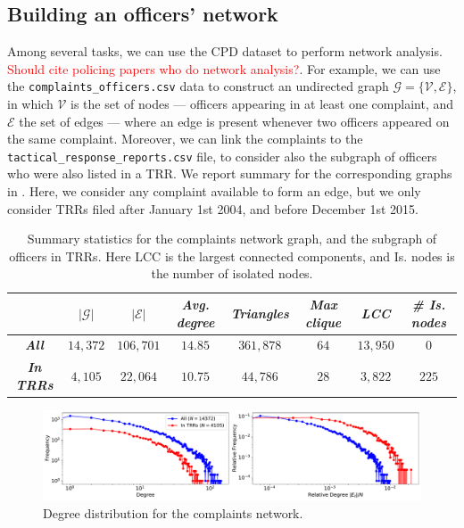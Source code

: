 
\subsection{Building an officers' network}

Among several tasks, we can use the CPD dataset to perform network analysis. \textcolor{red}{Should cite policing papers who do network analysis?}. For example, we can use the \texttt{complaints\_officers.csv} data to construct an undirected graph $\mathcal{G} = \{\mathcal{V}, \mathcal{E}\}$, in which $\mathcal{V}$ is the set of nodes --- officers appearing in at least one complaint, and $\mathcal{E}$ the set of edges --- where an edge is present whenever two officers appeared on the same complaint. Moreover, we can link the complaints to the \texttt{tactical\_response\_reports.csv} file, to consider also the subgraph of officers who were also listed in a TRR. We report summary for the corresponding graphs in . Here, we consider any complaint available to form an edge, but we only consider TRRs filed after January 1st 2004, and before December 1st 2015.

\begin{table}[h]
\begin{tabular}{c|c|c|c|c|c|c|c|}
\cline{2-8}
                                                & $|\mathcal{G}|$ & $|\mathcal{E}|$ & \textit{Avg. degree} & \textit{Triangles} & \textit{Max clique} & \textit{LCC} & \textit{\# Is. nodes} \\ \hline
\multicolumn{1}{|c|}{\textit{\textbf{All}}}     & $14{,}372$      & $106{,}701$     & $14.85$              & $361{,}878$        & $64$                & $13{,}950$   & $0$                   \\ \hline
\multicolumn{1}{|c|}{\textit{\textbf{In TRRs}}} & $4{,}105$       & $22{,}064$      & $10.75$              & $44{,}786$         & $28$                & $3{,}822$    & $225$                 \\ \hline
\end{tabular} \label{tab:stats_graphs}
\caption{Summary statistics for the complaints network graph, and the subgraph of officers in TRRs. Here LCC is the largest connected components, and Is. nodes is the number of isolated nodes.}
\end{table}

\begin{figure}[t!] 
	\includegraphics[width=\textwidth]{figs/degree_distribution} 
	\caption{Degree distribution for the complaints network.}
\label{fig:degree_distribution}
\end{figure}